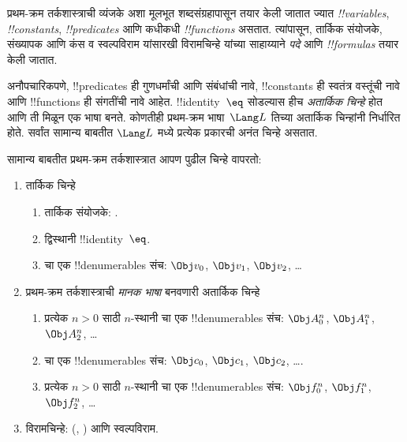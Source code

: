 \documentclass[../../../include/open-logic-section]{subfiles}
\begin{document}



प्रथम-क्रम तर्कशास्त्राची व्यंजके अशा मूलभूत शब्दसंग्रहापासून तयार
केली जातात ज्यात \emph{!!{variable}s}, \emph{!!{constant}s},
\emph{!!{predicate}s} आणि कधीकधी \emph{!!{function}s} असतात. त्यांपासून,
तार्किक संयोजके, संख्यापक आणि कंस व स्वल्पविराम यांसारखी विरामचिन्हे
यांच्या साहाय्याने \emph{पदे} आणि \emph{!!{formula}s} तयार केली जातात.

\begin{explain}
अनौपचारिकपणे, !!{predicate}s ही गुणधर्मांची आणि संबंधांची नावे,
!!{constant}s ही स्वतंत्र वस्तूंची नावे आणि !!{function}s ही
संगतींची नावे आहेत. !!{identity}~$\eq$ सोडल्यास हीच \emph{अतार्किक
चिन्हे} होत आणि ती मिळून एक भाषा बनते. कोणतीही प्रथम-क्रम
भाषा~$\Lang L$ तिच्या अतार्किक चिन्हांनी निर्धारित होते. सर्वांत
सामान्य बाबतीत $\Lang L$ मध्ये प्रत्येक प्रकारची अनंत चिन्हे असतात.
\end{explain}

सामान्य बाबतीत प्रथम-क्रम तर्कशास्त्रात आपण पुढील चिन्हे वापरतो:

\begin{enumerate}
\item तार्किक चिन्हे
\begin{enumerate}
\item तार्किक संयोजके:
  \startycommalist
  .
\item द्विस्थानी !!{identity}~$\eq$.
\item {}चा एक !!{denumerable}s संच: $\Obj v_0$, $\Obj v_1$, $\Obj
  v_2$, \dots
\end{enumerate}
\item प्रथम-क्रम तर्कशास्त्राची \emph{मानक भाषा} बनवणारी अतार्किक चिन्हे
\begin{enumerate}
\item प्रत्येक $n>0$ साठी $n$-स्थानी चा एक !!{denumerable}s संच: $\Obj
  A^n_0$, $\Obj A^n_1$, $\Obj A^n_2$, \dots
\item {}चा एक !!{denumerable}s संच: $\Obj c_0$, $\Obj c_1$, $\Obj
  c_2$, \dots.
\item प्रत्येक $n>0$ साठी $n$-स्थानी चा एक !!{denumerable}s संच:
  $\Obj f^n_0$, $\Obj f^n_1$, $\Obj f^n_2$, \dots
\end{enumerate}
\item विरामचिन्हे: (, ) आणि स्वल्पविराम.
\end{enumerate}
\end{document}
